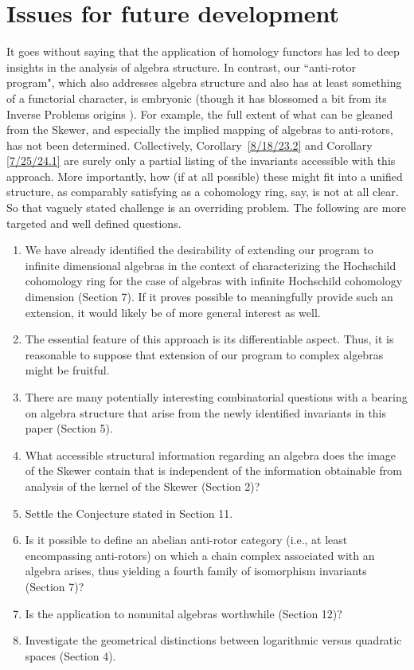 \documentclass{amsart}
\numberwithin{equation}{section}
\theoremstyle{definition}
\numberwithin{theorem}{section}
\begin{document}
\section{Issues for future development} 
It goes without saying that the application of homology functors has led to deep insights in the analysis of algebra structure.  In contrast, our ``anti-rotor program", which also addresses algebra structure and also has at least something of a functorial character, is embryonic  (though it has blossomed a bit from its Inverse Problems origins \cite{fgreensite:2022d}).  For example, the full extent of what can be gleaned from the Skewer, and especially the implied mapping of algebras to anti-rotors, has not been determined.  Collectively, \mbox{Corollary \ref{8/18/23.2}} and Corollary \ref{7/25/24.1} are surely only a partial listing of the invariants accessible with this approach.  More importantly, how (if at all possible) these might fit into a unified structure, as comparably satisfying as a cohomology ring, say, is not at all clear.  So that vaguely stated challenge is an overriding problem.  The following are more targeted and well defined questions.
 
\begin{enumerate}\item We have already identified the desirability of extending our program to \mbox{infinite} dimensional algebras in the context of characterizing the Hochschild cohomology ring for the case of algebras with infinite Hochschild cohomology dimension (Section 7).  If it proves possible to meaningfully provide such an extension, it would likely be of more general interest as well.
\item The essential feature of this approach is its differentiable aspect.  Thus, it is reasonable to suppose that extension of our program to complex algebras might be fruitful. 
\item There are many potentially interesting combinatorial questions with a bearing on algebra structure that arise from the newly identified invariants in this paper (Section 5). 
\item What accessible structural information regarding an algebra does the image of the Skewer contain that is independent of the information obtainable from analysis of the kernel of the Skewer (Section 2)? 
\item Settle the Conjecture stated in Section 11. \item Is it possible to define an abelian anti-rotor category  (i.e., at least encompassing anti-rotors) on which a chain complex associated with an algebra arises, thus yielding a fourth family of isomorphism invariants (Section 7)?
\item Is the application to nonunital algebras worthwhile (Section 12)?
\item Investigate the geometrical distinctions between logarithmic versus quadratic spaces (Section 4).
\end{enumerate}
\end{document}
